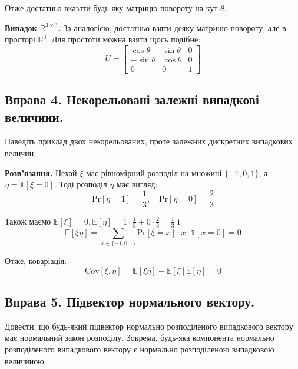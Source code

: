 \documentclass{hw_template}
\begin{document}
Отже достатньо вказати будь-яку матрицю повороту на кут $\theta$.

\textbf{Випадок $\mathbb{R}^{3 \times 3}$.} За аналогією, достатньо взяти деяку матрицю повороту, але в просторі $\mathbb{R}^3$. Для простоти можна взяти щось подібне:
\begin{equation*}
    U = \begin{bmatrix}
        \cos\theta & \sin\theta & 0 \\
        -\sin\theta & \cos\theta & 0 \\
        0 & 0 & 1
    \end{bmatrix}
\end{equation*}

\pagebreak

\subsection{Вправа 4. Некорельовані залежні випадкові величини.}

\begin{problem}
    Наведіть приклад двох некорельованих, проте залежних дискретних випадкових величин.
\end{problem}

\textbf{Розв'язання.} Нехай $\xi$ має рівномірний розподіл на множині $\{-1,0,1\}$, а $\eta = \mathds{1}[\xi=0]$. Тоді розподіл $\eta$ має вигляд:
\begin{equation*}
    \text{Pr}[\eta=1] = \frac{1}{3}, \quad \text{Pr}[\eta=0] = \frac{2}{3}
\end{equation*}

Також маємо $\mathbb{E}[\xi]=0,\mathbb{E}[\eta] = 1 \cdot \frac{1}{3} + 0 \cdot \frac{2}{3} = \frac{1}{3}$ і
\begin{equation*}
    \mathbb{E}[\xi\eta] = \sum_{x \in \{-1,0,1\}}\text{Pr}[\xi=x]\cdot x \cdot \mathds{1}[x=0] = 0
\end{equation*}

Отже, коваріація:
\begin{equation*}
    \text{Cov}[\xi,\eta] = \mathbb{E}[\xi\eta] - \mathbb{E}[\xi]\mathbb{E}[\eta] = 0
\end{equation*}

\pagebreak

\subsection{Вправа 5. Підвектор нормального вектору.}

\begin{problem}
    Довести, що будь-який підвектор нормально розподіленого випадкового вектору має нормальний закон розподілу. Зокрема, будь-яка компонента нормально розподіленого випадкового вектору є нормально розподіленою випадковою величиною.
\end{problem}
\end{document}
